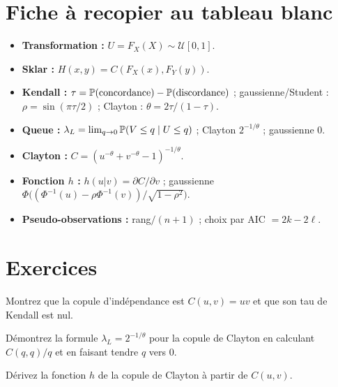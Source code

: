 \section{Fiche à recopier au tableau blanc}

\begin{whiteboard}
\begin{itemize}[leftmargin=1.2em]
\item \textbf{Transformation :} $U = F_X(X)\sim\mathcal U[0,1]$.
\item \textbf{Sklar :} $H(x,y) = C(F_X(x),F_Y(y))$.
\item \textbf{Kendall :} $\tau = \mathbb{P}(\text{concordance}) - \mathbb{P}(\text{discordance})$ ; gaussienne/Student : $\rho = \sin(\pi\tau/2)$ ; Clayton : $\theta = 2\tau/(1-\tau)$.
\item \textbf{Queue :} $\lambda_L = \lim_{q\to0}\mathbb{P}(V\le q\mid U\le q)$ ; Clayton $2^{-1/\theta}$ ; gaussienne 0.
\item \textbf{Clayton :} $C = (u^{-\theta}+v^{-\theta}-1)^{-1/\theta}$.
\item \textbf{Fonction $h$ :} $h(u|v) = \partial C/\partial v$ ; gaussienne $\Phi\big((\Phi^{-1}(u)-\rho\Phi^{-1}(v))/\sqrt{1-\rho^2}\big)$.
\item \textbf{Pseudo-observations :} rang$/(n+1)$ ; choix par AIC $= 2k-2\ell$.
\end{itemize}
\end{whiteboard}

\section{Exercices}

\begin{exercise}
Montrez que la copule d'indépendance est $C(u,v) = uv$ et que son tau de Kendall est nul.
\end{exercise}

\begin{exercise}
Démontrez la formule $\lambda_L = 2^{-1/\theta}$ pour la copule de Clayton en calculant $C(q,q)/q$ et en faisant tendre $q$ vers 0.
\end{exercise}

\begin{exercise}
Dérivez la fonction $h$ de la copule de Clayton à partir de $C(u,v)$.
\end{exercise}

